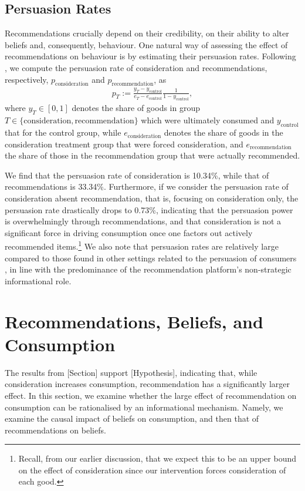 \documentclass[12pt]{article}
\theoremstyle{newtheorem}
\begin{document}
\subsection{Persuasion Rates}
\label{section:consumption-on-rec:persuasion}

Recommendations crucially depend on their credibility, on their ability to alter beliefs and, consequently, behaviour. 
One natural way of assessing the effect of recommendations on behaviour is by estimating their persuasion rates. 
Following \cite{DellaVignaGentzkow2010ARE}, we compute the persuasion rate of consideration and recommendations, respectively, $p_{\text{consideration}}$ and $p_{\text{recommendation}}$, as
\begin{align}
    p_T:=\frac{y_T-y_\text{control}}{e_T-e_\text{control}}\frac{1}{1-y_\text{control}},
\end{align}
where $y_T\in [0,1]$ denotes the share of goods in group $T \in \{\text{consideration}, \text{recommendation}\}$ which were ultimately consumed and $y_\text{control}$ that for the control group, while $e_\text{consideration}$ denotes the share of goods in the consideration treatment group that were forced consideration, and $e_\text{recommendation}$ the share of those in the recommendation group that were actually recommended.

We find that the persuasion rate of consideration is 10.34\%, while that of recommendations is 33.34\%.
Furthermore, if we consider the persuasion rate of consideration absent recommendation, that is, focusing on consideration only, the persuasion rate drastically drops to 0.73\%, indicating that the persuasion power is overwhelmingly through recommendations, and that consideration is not a significant force in driving consumption once one factors out actively recommended items.\footnote{
    Recall, from our earlier discussion, that we expect this to be an upper bound on the effect of consideration since our intervention forces consideration of each good.
} 
We also note that persuasion rates are relatively large compared to those found in other settings related to the persuasion of consumers \citep[see][]{DellaVignaGentzkow2010ARE}, in line with the predominance of the recommendation platform's non-strategic informational role.



\section{Recommendations, Beliefs, and Consumption}
\label{section:mechanisms}
The results from [Section] support [Hypothesis], indicating that, while consideration increases consumption, recommendation has a significantly larger effect. 
In this section, we examine whether the large effect of recommendation on consumption can be rationalised by an informational mechanism. 
Namely, we examine the causal impact of beliefs on consumption, and then that of recommendations on beliefs.
\end{document}

